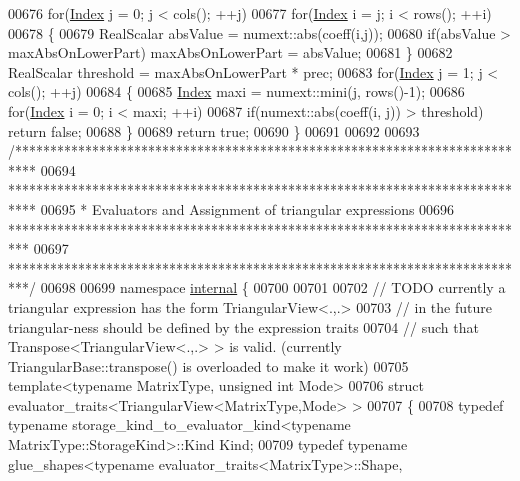 \begin{DoxyCode}
00676   \textcolor{keywordflow}{for}(\hyperlink{group___core___module_a554f30542cc2316add4b1ea0a492ff02}{Index} j = 0; j < cols(); ++j)
00677     \textcolor{keywordflow}{for}(\hyperlink{group___core___module_a554f30542cc2316add4b1ea0a492ff02}{Index} i = j; i < rows(); ++i)
00678     \{
00679       RealScalar absValue = numext::abs(coeff(i,j));
00680       \textcolor{keywordflow}{if}(absValue > maxAbsOnLowerPart) maxAbsOnLowerPart = absValue;
00681     \}
00682   RealScalar threshold = maxAbsOnLowerPart * prec;
00683   \textcolor{keywordflow}{for}(\hyperlink{group___core___module_a554f30542cc2316add4b1ea0a492ff02}{Index} j = 1; j < cols(); ++j)
00684   \{
00685     \hyperlink{group___core___module_a554f30542cc2316add4b1ea0a492ff02}{Index} maxi = numext::mini(j, rows()-1);
00686     \textcolor{keywordflow}{for}(\hyperlink{group___core___module_a554f30542cc2316add4b1ea0a492ff02}{Index} i = 0; i < maxi; ++i)
00687       \textcolor{keywordflow}{if}(numext::abs(coeff(i, j)) > threshold) \textcolor{keywordflow}{return} \textcolor{keyword}{false};
00688   \}
00689   \textcolor{keywordflow}{return} \textcolor{keyword}{true};
00690 \}
00691 
00692 
00693 \textcolor{comment}{/***************************************************************************}
00694 \textcolor{comment}{****************************************************************************}
00695 \textcolor{comment}{* Evaluators and Assignment of triangular expressions}
00696 \textcolor{comment}{***************************************************************************}
00697 \textcolor{comment}{***************************************************************************/}
00698 
00699 \textcolor{keyword}{namespace }\hyperlink{namespaceinternal}{internal} \{
00700 
00701   
00702 \textcolor{comment}{// TODO currently a triangular expression has the form TriangularView<.,.>}
00703 \textcolor{comment}{//      in the future triangular-ness should be defined by the expression traits}
00704 \textcolor{comment}{//      such that Transpose<TriangularView<.,.> > is valid. (currently TriangularBase::transpose() is
       overloaded to make it work)}
00705 \textcolor{keyword}{template}<\textcolor{keyword}{typename} MatrixType, \textcolor{keywordtype}{unsigned} \textcolor{keywordtype}{int} Mode>
00706 \textcolor{keyword}{struct }evaluator\_traits<TriangularView<MatrixType,Mode> >
00707 \{
00708   \textcolor{keyword}{typedef} \textcolor{keyword}{typename} storage\_kind\_to\_evaluator\_kind<typename MatrixType::StorageKind>::Kind Kind;
00709   \textcolor{keyword}{typedef} \textcolor{keyword}{typename} glue\_shapes<typename evaluator\_traits<MatrixType>::Shape, 

\end{DoxyCode}
